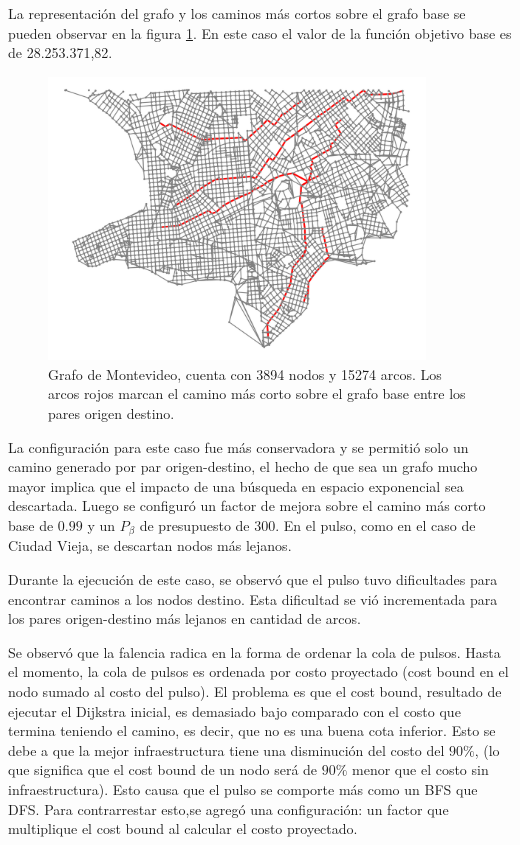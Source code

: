 \documentclass{article}
\begin{document}
  La representación del grafo y los caminos más cortos sobre el grafo base se pueden observar en la figura \ref{montevideo}. En este caso el valor de la función objetivo base es de 28.253.371,82.

  \begin{figure}[h!]
    \centering
    \includegraphics[width=10cm]{imgs/mdeo_large_base.png}
    \caption{Grafo de Montevideo, cuenta con 3894 nodos y 15274 arcos. Los arcos rojos marcan el camino más corto sobre el grafo base entre los pares origen destino.}
    \label{montevideo}
  \end{figure}

  La configuración para este caso fue más conservadora y se permitió solo un camino generado por par origen-destino, el hecho de que sea un grafo mucho mayor implica que el impacto de una búsqueda en espacio exponencial sea descartada. Luego se configuró un factor de mejora sobre el camino más corto base de $0.99$ y un $P_{\beta}$ de presupuesto de 300. En el pulso, como en el caso de Ciudad Vieja, se descartan nodos más lejanos.

  Durante la ejecución de este caso, se observó que el pulso tuvo dificultades para encontrar caminos a los nodos destino. Esta dificultad se vió incrementada para los pares origen-destino más lejanos en cantidad de arcos.

  Se observó que la falencia radica en la forma de ordenar la cola de pulsos. Hasta el momento, la cola de pulsos es ordenada por costo proyectado (cost bound en el nodo sumado al costo del pulso). El problema es que el cost bound, resultado de ejecutar el Dijkstra inicial, es demasiado bajo comparado con el costo que termina teniendo el camino, es decir, que no es una buena cota inferior. Esto se debe a que la mejor infraestructura tiene una disminución del costo del $90\%$, (lo que significa que el cost bound de un nodo será de $90\%$ menor que el costo sin infraestructura). Esto causa que el pulso se comporte más como un BFS que DFS. Para contrarrestar esto,se agregó una configuración: un factor que multiplique el cost bound al calcular el costo proyectado.
\end{document}
